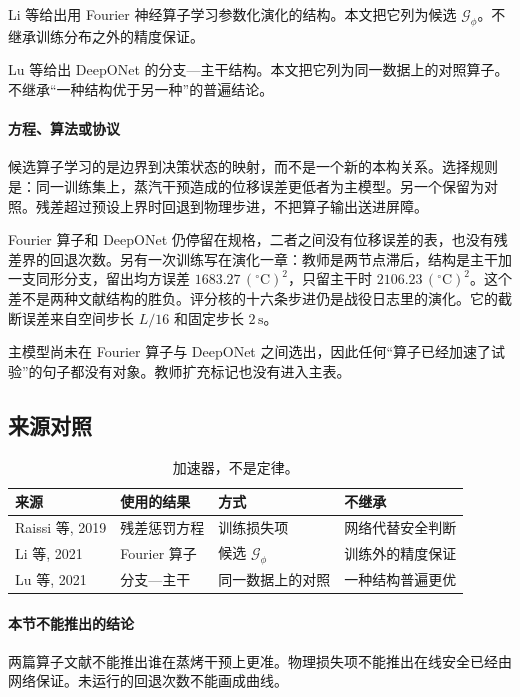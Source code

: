Li 等给出用 Fourier 神经算子学习参数化演化的结构\cite{li2021fno}。本文把它列为候选 $\mathcal{G}_\phi$。不继承训练分布之外的精度保证。

Lu 等给出 DeepONet 的分支—主干结构\cite{lu2021deeponet}。本文把它列为同一数据上的对照算子。不继承“一种结构优于另一种”的普遍结论。

\paragraph{方程、算法或协议}
候选算子学习的是边界到决策状态的映射，而不是一个新的本构关系。选择规则是：同一训练集上，蒸汽干预造成的位移误差更低者为主模型。另一个保留为对照。残差超过预设上界时回退到物理步进，不把算子输出送进屏障。

Fourier 算子和 DeepONet 仍停留在规格，二者之间没有位移误差的表，也没有残差界的回退次数。另有一次训练写在演化一章：教师是两节点滞后，结构是主干加一支同形分支，留出均方误差 $1683.27\,(^\circ\mathrm{C})^2$，只留主干时 $2106.23\,(^\circ\mathrm{C})^2$。这个差不是两种文献结构的胜负。评分核的十六条步进仍是战役日志里的演化。它的截断误差来自空间步长 $L/16$ 和固定步长 $2\,\mathrm{s}$。

主模型尚未在 Fourier 算子与 DeepONet 之间选出，因此任何“算子已经加速了试验”的句子都没有对象。教师扩充标记也没有进入主表。

\subsection{来源对照}
\begin{table}[ht]
\centering
\caption{加速器，不是定律。}
\begin{tabularx}{\textwidth}{lXll}
\toprule
来源 & 使用的结果 & 方式 & 不继承 \\
\midrule
Raissi 等, 2019 & 残差惩罚方程 & 训练损失项 & 网络代替安全判断 \\
Li 等, 2021 & Fourier 算子 & 候选 \(\mathcal{G}_\phi\) & 训练外的精度保证 \\
Lu 等, 2021 & 分支—主干 & 同一数据上的对照 & 一种结构普遍更优 \\
\bottomrule
\end{tabularx}
\end{table}

\paragraph{本节不能推出的结论}
两篇算子文献不能推出谁在蒸烤干预上更准。物理损失项不能推出在线安全已经由网络保证。未运行的回退次数不能画成曲线。

